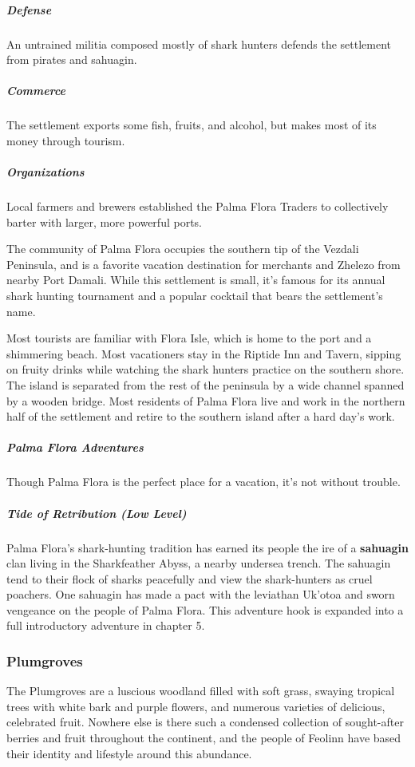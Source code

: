 \documentclass[10pt,a4paper,twoside,bg=print,twocolumn,openany,nodeprecatedcode]{dndbook}
\begin{document}
\subparagraph{Defense}
An untrained militia composed mostly of shark hunters defends the settlement from pirates and sahuagin.

\subparagraph{Commerce}
The settlement exports some fish, fruits, and alcohol, but makes most of its money through tourism.

\subparagraph{Organizations}
Local farmers and brewers established the Palma Flora Traders to collectively barter with larger, more powerful ports.

The community of Palma Flora occupies the southern tip of the Vezdali Peninsula, and is a favorite vacation destination for merchants and Zhelezo from nearby Port Damali. While this settlement is small, it's famous for its annual shark hunting tournament and a popular cocktail that bears the settlement's name.

Most tourists are familiar with Flora Isle, which is home to the port and a shimmering beach. Most vacationers stay in the Riptide Inn and Tavern, sipping on fruity drinks while watching the shark hunters practice on the southern shore. The island is separated from the rest of the peninsula by a wide channel spanned by a wooden bridge. Most residents of Palma Flora live and work in the northern half of the settlement and retire to the southern island after a hard day's work.

\subparagraph{Palma Flora Adventures}
Though Palma Flora is the perfect place for a vacation, it's not without trouble.

\subparagraph{Tide of Retribution (Low Level)}
Palma Flora's shark-hunting tradition has earned its people the ire of a \textbf{sahuagin} clan living in the Sharkfeather Abyss, a nearby undersea trench. The sahuagin tend to their flock of sharks peacefully and view the shark-hunters as cruel poachers. One sahuagin has made a pact with the leviathan Uk'otoa and sworn vengeance on the people of Palma Flora. This adventure hook is expanded into a full introductory adventure in chapter 5.

\subsubsection{Plumgroves}
The Plumgroves are a luscious woodland filled with soft grass, swaying tropical trees with white bark and purple flowers, and numerous varieties of delicious, celebrated fruit. Nowhere else is there such a condensed collection of sought-after berries and fruit throughout the continent, and the people of Feolinn have based their identity and lifestyle around this abundance.
\end{document}
